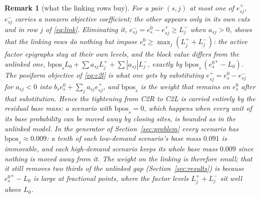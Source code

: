 \documentclass[11pt]{article}
\newtheorem{remark}{Remark}
\newcommand{\bpos}{\mathrm{bpos}}
\begin{document}
\begin{remark}[what the linking rows buy]\label{rem:bpos}
For a pair $(s,j)$ at most one of $e^+_{sj}$, $e^-_{sj}$ carries a nonzero objective coefficient; the other appears
only in its own cuts and in row $j$ of \eqref{eq:link}. Eliminating it, $e^-_{sj} = e^0_s - e^+_{sj}\ge L^-_j$ when
$a_{sj}>0$, shows that the linking rows do nothing but impose $e^0_s\ge\max_j(L^+_j+L^-_j)$: the active factor
epigraphs stay at their own levels, and the block value differs from the unlinked one, $\bpos_sL_0 + \sum a_{sj}L^+_j
+ \sum|a_{sj}|L^-_j$, exactly by $\bpos_s\,(e^{0*}_s - L_0)$. The posiform objective of \eqref{eq:c2l} is what one
gets by substituting $e^+_{sj} = e^0_s - e^-_{sj}$ for $a_{sj}<0$ into $b_se^0_s + \sum_j a_{sj}e^+_{sj}$, and
$\bpos_s$ is the weight that remains on $e^0_s$ after that substitution. Hence the tightening from \textsc{C2R} to
\textsc{C2L} is carried entirely by the residual base mass: a scenario with $\bpos_s = 0$, which happens when every
unit of its base probability can be moved away by closing sites, is bounded as in the unlinked model. In the generator
of Section~\ref{sec:problem} every scenario has $\bpos_s\approx 0.009$: a tenth of each low-demand scenario's base
mass $0.091$ is immovable, and each high-demand scenario keeps its whole base mass $0.009$ since nothing is moved
away from it. The weight on the linking is therefore small; that it still removes two thirds of the unlinked gap (Section~\ref{sec:results}) is
because $e^{0*}_s - L_0$ is large at fractional points, where the factor levels $L^+_j + L^-_j$ sit well above $L_0$.
\end{remark}
\end{document}
